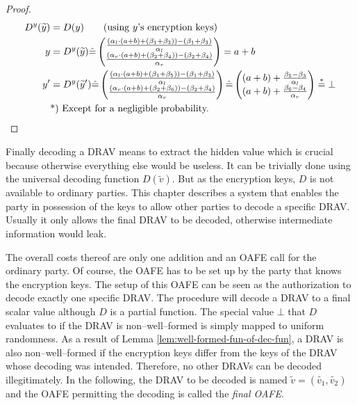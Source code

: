 \begin{proof}
  \begin{align*}
    D^y(\widetilde{y}) &= D(y) \qquad\text{(using $y$'s encryption keys)}\\
    y &= D^y(\widetilde{y}) \hat{=}
    \begin{pmatrix}
      \frac{(\alpha_l \cdot (a+b) + (\beta_1 + \beta_3)) - (\beta_1+\beta_3)}
           {\alpha_l}\\
      \frac{(\alpha_r \cdot (a+b) + (\beta_2 + \beta_4)) - (\beta_2+\beta_4)}
           {\alpha_r}\\
    \end{pmatrix}
    = a+b\\
    y' &= D^y(\widetilde{y}')
    \hat{=}
    \begin{pmatrix}
      \frac{(\alpha_l \cdot (a+b) + (\beta_1 + \beta_5)) - (\beta_1+\beta_3)}
           {\alpha_l}\\
      \frac{(\alpha_r \cdot (a+b) + (\beta_2 + \beta_6)) - (\beta_2+\beta_4)}
           {\alpha_r}\\
    \end{pmatrix}
    \hat{=}
    \begin{pmatrix}
      (a+b) +
      \frac{\beta_5 - \beta_3}{\alpha_l}\\
      (a+b) +
      \frac{\beta_6 - \beta_4}{\alpha_r}\\
    \end{pmatrix}
    \stackrel{*}{=} \bot\\
    &\text{*) Except for a negligible probability.}{}
  \end{align*}
\end{proof}


\label{sec:drav-final-decoding}

Finally decoding a DRAV means to extract the hidden value which is crucial
because otherwise everything else would be useless. It can be trivially done
using the universal decoding function $D(\widetilde{v})$. But as the encryption
keys, $D$ is not available to ordinary parties. This chapter describes a system
that enables the party in possession of the keys to allow other parties to
decode a specific DRAV. Usually it only allows the final DRAV to be decoded,
otherwise intermediate information would leak.

The overall costs thereof are only one addition and an OAFE call for the
ordinary party. Of course, the OAFE has to be set up by the party that knows the
encryption keys. The setup of this OAFE can be seen as the authorization to
decode exactly one specific DRAV. The procedure will decode a DRAV to a final
scalar value although $D$ is a partial function. The special value $\bot$ that
$D$ evaluates to if the DRAV is non--well--formed is simply mapped to uniform
randomness. As a result of Lemma \ref{lem:well-formed-fun-of-dec-fun}, a DRAV is
also non--well--formed if the encryption keys differ from the keys of the DRAV
whose decoding was intended. Therefore, no other DRAVs can be decoded
illegitimately. In the following, the DRAV to be decoded is named $\widetilde{v}
= (\widetilde{v_1}, \widetilde{v_2})$ and the OAFE permitting the decoding is
called the \emph{final OAFE}.

